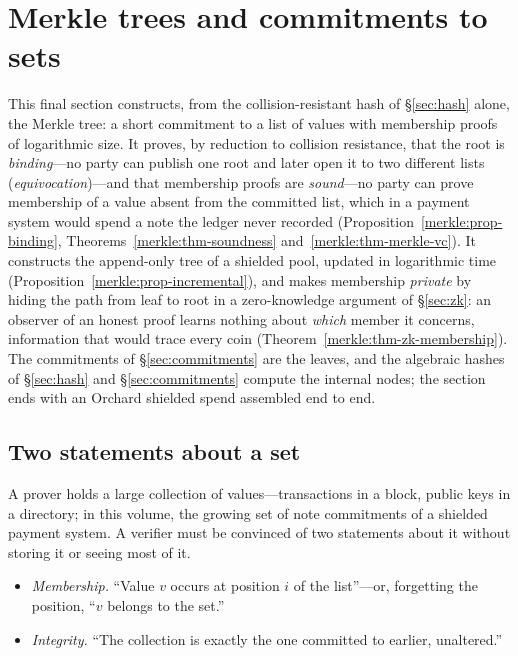 \documentclass[11pt,a4paper]{article}
\theoremstyle{definition}
\theoremstyle{remark}
\begin{document}
\section{Merkle trees and commitments to sets}\label{sec:merkle}

This final section constructs, from the collision-resistant hash of
\S\ref{sec:hash} alone, the Merkle tree: a short commitment to a list of
values with membership proofs of logarithmic size. It proves, by
reduction to collision resistance, that the root is \emph{binding}---no
party can publish one root and later open it to two different lists
(\emph{equivocation})---and that membership proofs are
\emph{sound}---no party can prove membership of a value absent from the
committed list, which in a payment system would spend a note the ledger
never recorded (Proposition~\ref{merkle:prop-binding},
Theorems~\ref{merkle:thm-soundness} and~\ref{merkle:thm-merkle-vc}). It
constructs the append-only tree of a shielded pool, updated in
logarithmic time (Proposition~\ref{merkle:prop-incremental}), and makes
membership \emph{private} by hiding the path from leaf to root in a
zero-knowledge argument of \S\ref{sec:zk}: an observer of an honest
proof learns nothing about \emph{which} member it concerns, information
that would trace every coin (Theorem~\ref{merkle:thm-zk-membership}).
The commitments of \S\ref{sec:commitments} are the leaves, and the
algebraic hashes of \S\ref{sec:hash} and \S\ref{sec:commitments}
compute the internal nodes; the section ends with an Orchard shielded
spend assembled end to end.

\subsection{Two statements about a set}\label{merkle:sec-statements}

A prover holds a large collection of values---transactions in a block,
public keys in a directory; in this volume, the growing set of note
commitments of a shielded payment system. A verifier must be convinced
of two statements about it without storing it or seeing most of it.

\begin{itemize}
\item \emph{Membership.} ``Value \(v\) occurs at position \(i\) of the
  list''---or, forgetting the position, ``\(v\) belongs to the set.''
\item \emph{Integrity.} ``The collection is exactly the one committed
  to earlier, unaltered.''
\end{itemize}
\end{document}
